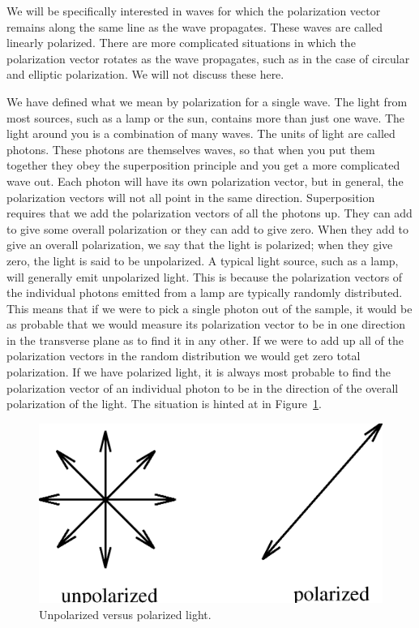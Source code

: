 We will be specifically interested in waves for which the polarization vector
remains along the same line as the wave propagates. These waves are called 
linearly polarized. There are more complicated situations in which the 
polarization vector rotates as the wave propagates, such as in the case of 
circular and elliptic polarization. We will not discuss these here.

We have defined what we mean by polarization for a single wave.  The light from
most sources, such as a lamp or the sun, contains more than just one wave.
The light around you is a combination of many waves.  The units of light are 
called photons.  These photons are themselves waves, so that when you put them 
together they obey the superposition principle and you get a more complicated 
wave out. Each photon will have its own polarization vector, but in general, 
the polarization vectors will not all point in the same direction.  
Superposition requires that we add the polarization vectors of all the photons 
up. They can add to give some overall polarization or they can add to give 
zero. When they add to give an overall polarization, we say that the light is 
polarized; when they give zero, the light is said to be unpolarized.  A 
typical light source, such as a lamp, will generally emit unpolarized light. 
This is because the polarization vectors of the individual photons emitted 
from a lamp are typically randomly distributed. This means that if we were to 
pick a single photon out of the sample, it would be as probable that we would 
measure its polarization vector to be in one direction in the transverse plane 
as to find it in any other.  If we were to add up all of the polarization 
vectors in the random distribution we would get zero total polarization. If we 
have polarized light, it is always most probable to find the polarization 
vector of an individual photon to be in the direction of the overall 
polarization of the light. The situation is hinted at in 
Figure~\ref{fig:pol:unpolarized}.
\begin{figure}
\centering 
\epsfxsize=7cm \includegraphics[scale=0.6]{7_polarization/unpolarized.eps}
\caption{Unpolarized versus polarized light.}
\label{fig:pol:unpolarized}
\end{figure}

